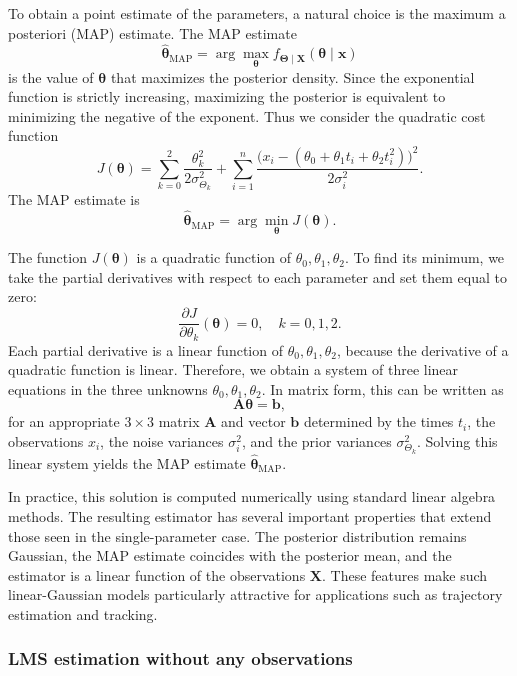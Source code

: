 To obtain a point estimate of the parameters, a natural choice is the maximum a posteriori (MAP) estimate.  
The MAP estimate
\[
\hat{\boldsymbol{\theta}}_{\text{MAP}}
=
\arg\max_{\boldsymbol{\theta}} f_{\boldsymbol{\Theta}\mid \mathbf{X}}(\boldsymbol{\theta}\mid \mathbf{x})
\]
is the value of \(\boldsymbol{\theta}\) that maximizes the posterior density.  
Since the exponential function is strictly increasing, maximizing the posterior is equivalent to minimizing the negative of the exponent.  
Thus we consider the quadratic cost function
\[
J(\boldsymbol{\theta})
=
\sum_{k=0}^{2}\frac{\theta_{k}^{2}}{2\sigma_{\Theta_{k}}^{2}}
+
\sum_{i=1}^{n}
\frac{\big(x_{i} - (\theta_{0} + \theta_{1} t_{i} + \theta_{2} t_{i}^{2})\big)^{2}}{2\sigma_{i}^{2}}.
\]
The MAP estimate is
\[
\hat{\boldsymbol{\theta}}_{\text{MAP}}
=
\arg\min_{\boldsymbol{\theta}} J(\boldsymbol{\theta}).
\]

The function \(J(\boldsymbol{\theta})\) is a quadratic function of \(\theta_{0},\theta_{1},\theta_{2}\).  
To find its minimum, we take the partial derivatives with respect to each parameter and set them equal to zero:
\[
\frac{\partial J}{\partial \theta_{k}}(\boldsymbol{\theta}) = 0,
\quad
k = 0,1,2.
\]
Each partial derivative is a linear function of \(\theta_{0},\theta_{1},\theta_{2}\), because the derivative of a quadratic function is linear.  
Therefore, we obtain a system of three linear equations in the three unknowns \(\theta_{0},\theta_{1},\theta_{2}\).  
In matrix form, this can be written as
\[
\mathbf{A}\boldsymbol{\theta}
=
\mathbf{b},
\]
for an appropriate \(3 \times 3\) matrix \(\mathbf{A}\) and vector \(\mathbf{b}\) determined by the times \(t_{i}\), the observations \(x_{i}\), the noise variances \(\sigma_{i}^{2}\), and the prior variances \(\sigma_{\Theta_{k}}^{2}\).  
Solving this linear system yields the MAP estimate \(\hat{\boldsymbol{\theta}}_{\text{MAP}}\).

In practice, this solution is computed numerically using standard linear algebra methods.  
The resulting estimator has several important properties that extend those seen in the single-parameter case.  
The posterior distribution remains Gaussian, the MAP estimate coincides with the posterior mean, and the estimator is a linear function of the observations \(\mathbf{X}\).  
These features make such linear-Gaussian models particularly attractive for applications such as trajectory estimation and tracking.


\subsubsection{LMS estimation without any observations}

